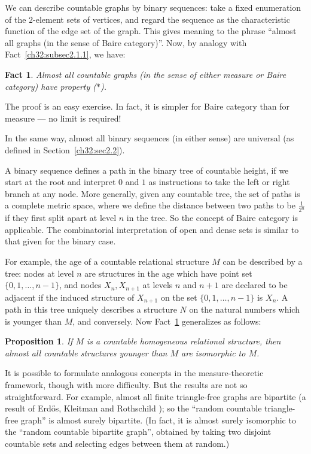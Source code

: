\documentclass{book}
\newtheorem{fact}{Fact}
\newtheorem{proposition}{Proposition}
\begin{document}
We can describe countable graphs by binary sequences: take a fixed
enumeration of the $2$-element sets of vertices, and regard the
sequence as the characteristic function of the edge set of the
graph. This gives meaning to the phrase ``almost all graphs (in the
sense of Baire category)''. Now, by analogy with
Fact~\ref{ch32:subsec2.1.1}, we have:

\begin{fact}\label{ch32:subsec2.7.1} 
Almost all countable graphs (in the
sense of either measure or Baire category) have property ($\ast$).
\end{fact}

The proof is an easy exercise. In fact, it is simpler for Baire
category than for measure --- no limit is required!

In the same way, almost all binary sequences (in either sense) are
universal (as defined in Section~\ref{ch32:sec2.2}).

A binary sequence defines a path in the binary tree of countable
height, if we start at the root and interpret $0$ and $1$ as instructions
to take the left or right branch at any node. More generally, given
any countable tree, the set of paths is a complete metric space,
where we define the distance between two paths to be $\frac{1}{2^n}$
if they first split apart at level $n$ in the tree. So the concept
of Baire category is applicable. The combinatorial interpretation of
open and dense sets is similar to that given for the binary case.

For example, the age of a countable relational structure $M$ can be
described by a tree: nodes at level $n$ are structures in the age
which have point set $\{0, 1, \ldots,  n-1\}$, and nodes $X_n,
X_{n +1}$ at levels $n$ and $n +1$ are declared to be adjacent if
the induced structure of $X_{n+1}$ on the set $\{0, 1, \ldots,
n-1\}$ is $X_n$. A path in this tree uniquely describes a structure
$N$ on the natural numbers which is younger than $M$, and
conversely. Now Fact~\ref{ch32:subsec2.7.1} generalizes as follows:

\begin{proposition}\label{ch32:prop7.1} 
If $M$ is a countable homogeneous relational
structure, then almost all countable structures younger than $M$ are
isomorphic to $M$.
\end{proposition}

It is possible to formulate analogous concepts in the
measure-theoretic framework, though with more difficulty. But the
results are not so straightforward. For example, almost all finite
triangle-free graphs are bipartite (a result of Erd\H{o}s, Kleitman
and Rothschild \cite{ch32:bib17}); so the ``random countable
triangle-free graph'' is almost surely bipartite. (In fact, it is
almost surely isomorphic to the ``random countable bipartite graph'',
obtained by taking two disjoint countable sets and selecting edges
between them at random.)
\end{document}
